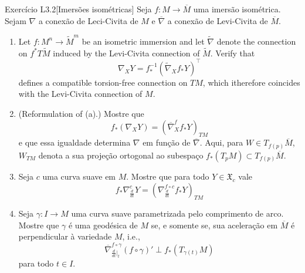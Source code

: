 \begin{thing6}{Exercício L3.2}[Imersões isométricas]\label{exer:L3.2}\leavevmode
Seja \(f:M \to \overline{M}\) uma imersão isométrica. Sejam \(\nabla\) a conexão de Leci-Civita de \(M\) e \(\overline{\nabla}\) a conexão de Levi-Civita de \(\overline{M}\).
\begin{enumerate}[label=(\alph*)]
\item Let \(f:M^n \to \widetilde{M}^m\) be an isometric immersion and let \(\widetilde{\nabla}\) denote the connection on \(f^*T \widetilde{M}\) induced by the Levi-Civita connection of \(\widetilde{M}\). Verify that
	\[\nabla_XY=f^{-1}_*\left(\widetilde{\nabla}_X f_*Y\right)^\top\]
defines a compatible torsion-free connection on \(TM\), which itherefore coincides with the Levi-Civita connection of \(M\).	

\item  (Reformulation of (a).) Mostre que
	\[f_*(\nabla_XY)=\left(\overline{\nabla}^f_Xf_*Y\right)_{TM}\]
e que essa igualdade determina \(\nabla\) em função de \(\overline{\nabla}\). Aqui, para \(W \in T_{f(p)}\overline{M}\), \(W_{TM}\) denota a sua projeção ortogonal ao subespaço \(f_*(T_pM) \subset T_{f(p)}\overline{M}\).
\item Seja \(c\) uma curva suave em \(M\). Mostre que para todo \(Y \in \mathfrak{X}_c\) vale
	\[f_*\nabla^c_{\frac{d}{dt}}Y=\left(\nabla^{f \circ c}_{\frac{d}{dt}}f_*Y\right)_{TM} \]
\item Seja \(\gamma:I \to M\) uma curva suave parametrizada pelo comprimento de arco. Mostre que \(\gamma\) é uma geodésica de \(M\) se, e somente se, sua aceleração em \(\overline{M}\) é perpendicular à variedade \(M\), i.e.,
	\[\overline{\nabla}^{f \circ \gamma}_{\frac{d}{dt}\Big|_{t}}(f \circ \gamma)' \perp f_*(T_{\gamma(t)}M)\]
	para todo \(t \in I\).
\end{enumerate}
\end{thing6}

